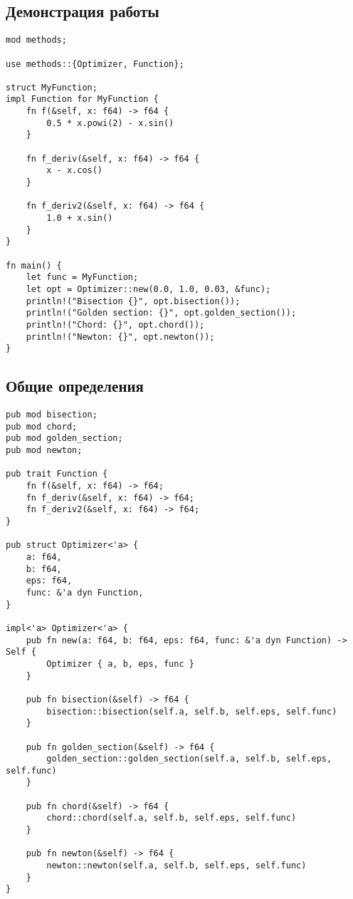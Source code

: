 \subsection{Демонстрация работы}
\begin{lstlisting}
mod methods;

use methods::{Optimizer, Function};

struct MyFunction;
impl Function for MyFunction {
    fn f(&self, x: f64) -> f64 {
        0.5 * x.powi(2) - x.sin()
    }

    fn f_deriv(&self, x: f64) -> f64 {
        x - x.cos()
    }

    fn f_deriv2(&self, x: f64) -> f64 {
        1.0 + x.sin()
    }
}

fn main() {
    let func = MyFunction;
    let opt = Optimizer::new(0.0, 1.0, 0.03, &func);
    println!("Bisection {}", opt.bisection());
    println!("Golden section: {}", opt.golden_section());
    println!("Chord: {}", opt.chord());
    println!("Newton: {}", opt.newton());
}
\end{lstlisting}

\subsection{Общие определения}
\begin{lstlisting}
pub mod bisection;
pub mod chord;
pub mod golden_section;
pub mod newton;

pub trait Function {
    fn f(&self, x: f64) -> f64;
    fn f_deriv(&self, x: f64) -> f64;
    fn f_deriv2(&self, x: f64) -> f64;
}

pub struct Optimizer<'a> {
    a: f64,
    b: f64,
    eps: f64,
    func: &'a dyn Function,
}

impl<'a> Optimizer<'a> {
    pub fn new(a: f64, b: f64, eps: f64, func: &'a dyn Function) -> Self {
        Optimizer { a, b, eps, func }
    }

    pub fn bisection(&self) -> f64 {
        bisection::bisection(self.a, self.b, self.eps, self.func)
    }

    pub fn golden_section(&self) -> f64 {
        golden_section::golden_section(self.a, self.b, self.eps, self.func)
    }

    pub fn chord(&self) -> f64 {
        chord::chord(self.a, self.b, self.eps, self.func)
    }

    pub fn newton(&self) -> f64 {
        newton::newton(self.a, self.b, self.eps, self.func)
    }
}
\end{lstlisting}

